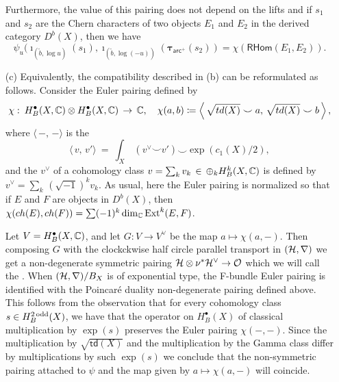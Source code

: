 \documentclass[twoside,leqno]{article}
\numberwithin{equation}{section}
\theoremstyle{plain}
\theoremstyle{definition}
\begin{document}
\begin{itemize}[wide]
\[\]
Furthermore, the value of this pairing does not depend on the lifts and if $s_{1}$ and $s_{2}$  are the Chern characters of two objects 
$E_{1}$ and $E_{2}$ in the derived category $D^{b}(X)$, then we have
\[\psi_{u}(\imath_{(\tilde{b},\log u)}(s_{1}),\imath_{(\tilde{b},\log (-u))}(\boldsymbol{\tau}_{\mathsf{arc}^{+}}(s_{2})) = \chi(\mathsf{RHom}(E_{1},E_{2})).\]
\item[(c)] Equivalently, the compatibility described in (b) can be reformulated as follows.
Consider the Euler pairing
defined by 
\[
\chi \, \colon \, H^{\bullet}_{B}(X,\mathbb C)\otimes H^{\bullet}_{B}(X,\mathbb C) \, \to \, \mathbb C, \quad \chi(a,b) \coloneqq \left\langle \, \sqrt{td(X)}\smile a,\, \sqrt{td(X)}\smile b\, \right\rangle,
\] 
where 
$\langle \, -,\, - \rangle$ is the  
\[
\langle\, v, \, v'\rangle \ = \ \int_{X} \, (v^{\vee} \smile v' )\smile \exp(c_{1}(X)/2),
\]
and the  $v^{\vee}$ of a cohomology class $v = \sum_{k} v_{k} \, \in \, \oplus_{k} H^{k}_{B}(X,\mathbb C)$ is defined by $v^{\vee} = \sum_{k} \, (\sqrt{-1})^{k} v_{k}$. 
As usual, here the Euler pairing is normalized so that if $E$ and $F$ are objects in $D^{b}(X)$, then $\chi(ch(E),ch(F)) = \sum (-1)^{k} \dim_{\mathbb C} \operatorname{Ext}^{k}(E,F)$.

\qquad Let $V = H^{\bullet}_{B}(X,\mathbb C)$, and let $G \colon V \to V^{\vee}$ be the map $a \mapsto \chi(a,-)$. Then composing $G$ with the clockckwise half circle parallel transport in $(\mathcal H,\nabla)$ we get a non-degenerate symmetric pairing $\mathcal H\otimes\nu^{*}\mathcal H^{\vee} \to \mathcal O$  which we will call the . When $(\mathcal H,\nabla)/B_{X}$ is of exponential type,  the F-bundle Euler pairing is identified with the Poincar\'{e} duality non-degenerate pairing defined above. This follows from the observation that 
for every cohomology class 
$s \in H^{2\,\mathrm{odd}}_{B}(X)$, we have that the operator on $H^{\bullet}_{B}(X)$ of classical multiplication by $\exp(s)$ preserves the Euler pairing $\chi(-,-)$. Since the multiplication by $\sqrt{\mathsf{td}(X)}$ and the multiplication by the Gamma class differ by multiplications by such $\exp(s)$ we conclude that the non-symmetric pairing attached to $\psi$ and the map given by $a \mapsto \chi(a,-)$ will coincide. 




\end{itemize}
\end{document}
